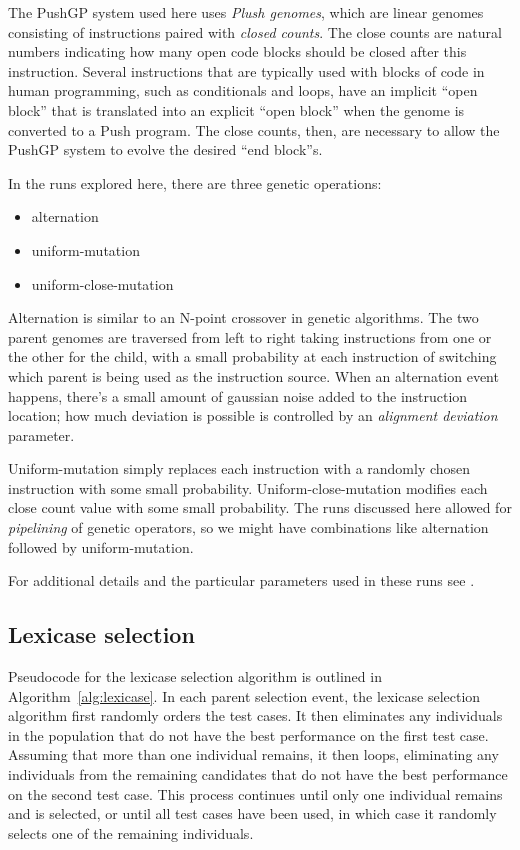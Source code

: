 The PushGP system used here uses \emph{Plush genomes}, which are linear genomes consisting of 
instructions paired with \emph{closed counts}. The close counts are natural numbers 
indicating how many open code blocks should be closed after this instruction. Several instructions
that are typically used with blocks of code in human programming, such as conditionals and loops,
have an implicit ``open block'' that is translated into an explicit ``open block'' when the genome
is converted to a Push program. The close counts, then, are necessary to allow the PushGP
system to evolve the desired ``end block''s.

In the runs explored here, there are three genetic operations:
\begin{itemize}
	\item alternation
	\item uniform-mutation
	\item uniform-close-mutation
\end{itemize}
Alternation is similar to an N-point crossover in genetic algorithms. The two parent genomes
are traversed from left to right taking instructions from one or the other for the child, with
a small probability at each instruction of switching which parent is being used as the instruction
source. When an alternation event happens, there's a small amount of gaussian noise added to the
instruction location; how much deviation is possible is controlled by an \emph{alignment deviation} 
parameter.

Uniform-mutation simply replaces each instruction with a randomly chosen instruction with some
small probability. Uniform-close-mutation modifies each close count value with some small probability.
The runs discussed here allowed for \emph{pipelining} of genetic operators, so we might have
combinations like alternation followed by uniform-mutation.

For additional details and the particular parameters used in these runs see \citep{Helmuth:2015:GECCO}.

\subsection{Lexicase selection}

Pseudocode for the lexicase selection algorithm is outlined in 
Algorithm~\ref{alg:lexicase}. In each parent selection event, the lexicase selection algorithm 
first randomly orders the test cases. It then eliminates any individuals in the population 
that do not have the best performance on the first test case. 
Assuming that more than one individual remains, it then loops, eliminating any individuals from 
the remaining candidates that do not have the best performance on the second test case. This 
process continues until only one individual remains and is selected, or until all test cases 
have been used, in which case it randomly selects one of the remaining individuals.

